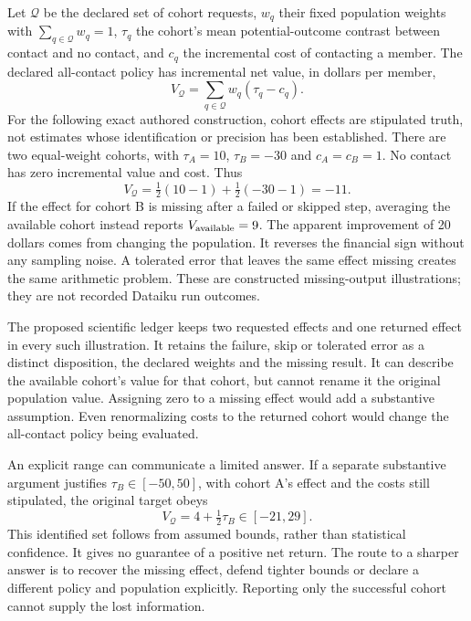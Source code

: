 Let $\mathcal Q$ be the declared set of cohort requests, $w_q$ their fixed
population weights with $\sum_{q\in\mathcal Q}w_q=1$, $\tau_q$ the cohort's
mean potential-outcome contrast between contact and no contact, and $c_q$
the incremental cost of contacting a member. The declared all-contact policy
has incremental net value, in dollars per member,
\begin{equation}
 V_{\mathcal Q}=\sum_{q\in\mathcal Q}w_q(\tau_q-c_q).
 \label{exec23:dss-target}
\end{equation}
For the following exact authored construction, cohort effects are stipulated
truth, not estimates whose identification or precision has been established.
There are two equal-weight cohorts, with $\tau_A=10$, $\tau_B=-30$ and
$c_A=c_B=1$. No contact has zero incremental value and cost. Thus
\begin{equation}
 V_{\mathcal Q}=\tfrac12(10-1)+\tfrac12(-30-1)=-11.
 \label{exec23:dss-full-net}
\end{equation}
If the effect for cohort B is missing after a failed or skipped step, averaging
the available cohort instead reports $V_{\rm available}=9$. The apparent
improvement of 20 dollars comes from changing the population. It reverses the
financial sign without any sampling noise. A tolerated error that leaves the
same effect missing creates the same arithmetic problem. These are constructed
missing-output illustrations; they are not recorded Dataiku run outcomes.
\citep{exec23_dss_denominator_reference}

The proposed scientific ledger keeps two requested effects and one returned
effect in every such illustration. It retains the failure, skip or tolerated
error as a distinct disposition, the declared weights and the missing result.
It can describe the available cohort's value for that cohort, but cannot
rename it the original population value. Assigning zero to a missing effect
would add a substantive assumption. Even renormalizing costs to the returned
cohort would change the all-contact policy being evaluated.

An explicit range can communicate a limited answer. If a separate substantive
argument justifies $\tau_B\in[-50,50]$, with cohort A's effect and the costs
still stipulated, the original target obeys
\begin{equation}
 V_{\mathcal Q}=4+\tfrac12\tau_B\in[-21,29].
 \label{exec23:dss-bounds}
\end{equation}
This identified set follows from assumed bounds, rather than statistical
confidence. It gives no guarantee of a positive net return. The route to a
sharper answer is to recover the missing effect, defend tighter bounds or
declare a different policy and population explicitly. Reporting only the
successful cohort cannot supply the lost information.
\citep{exec23_dss_denominator_reference}

